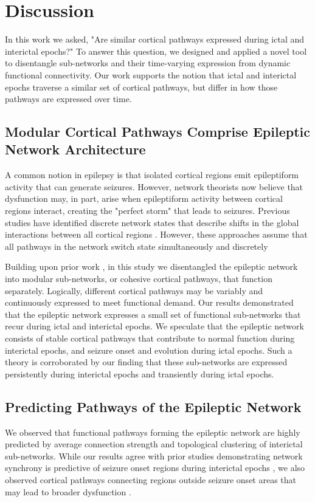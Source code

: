 \section{Discussion}
In this work we asked, "Are similar cortical pathways expressed during ictal and interictal epochs?" To answer this question, we designed and applied a novel tool to disentangle sub-networks and their time-varying expression from dynamic functional connectivity. Our work supports the notion that ictal and interictal epochs traverse a similar set of cortical pathways, but differ in how those pathways are expressed over time. 

\subsection{Modular Cortical Pathways Comprise Epileptic Network Architecture}
A common notion in epilepsy is that isolated cortical regions emit epileptiform activity that can generate seizures. However, network theorists now believe that dysfunction may, in part, arise when epileptiform activity between cortical regions interact, creating the "perfect storm" that leads to seizures. Previous studies have identified discrete network states that describe shifts in the global interactions between all cortical regions \cite{rummel2013systems-level, burns2014network}.  However, these approaches assume that all pathways in the network switch state simultaneously and discretely

Building upon prior work \cite{eavani2013unsupervised, leonardi2013principal, leonardi2014disentangling}, in this study we disentangled the epileptic network into modular sub-networks, or cohesive cortical pathways, that function separately. Logically, different cortical pathways may be variably and continuously expressed to meet functional demand. Our results demonstrated that the epileptic network expresses a small set of functional sub-networks that recur during ictal and interictal epochs. We speculate that the epileptic network consists of stable cortical pathways that contribute to normal function during interictal epochs, and seizure onset and evolution during ictal epochs. Such a theory is corroborated by our finding that these sub-networks are expressed persistently during interictal epochs and transiently during ictal epochs.  


\subsection{Predicting Pathways of the Epileptic Network}
We observed that functional pathways forming the epileptic network are highly predicted by average connection strength and topological clustering of interictal sub-networks. While our results agree with prior studies demonstrating network synchrony is predictive of seizure onset regions during interictal epochs \cite{warren2010synchrony, korzeniewska2014ictal}, we also observed cortical pathways connecting regions outside seizure onset areas that may lead to broader dysfunction \cite{schevon2007cortical, zaveri2009localization-related, weiss2013ictal, rummel2013systems-level}.

